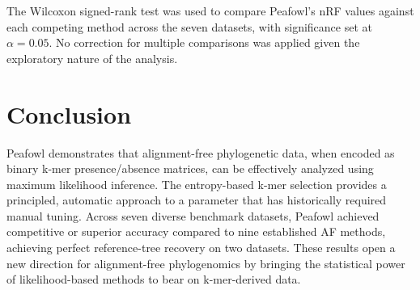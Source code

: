 \documentclass[11pt]{article}
\begin{document}
The Wilcoxon signed-rank test was used to compare Peafowl's nRF values against each competing method across the seven datasets, with significance set at $\alpha = 0.05$. No correction for multiple comparisons was applied given the exploratory nature of the analysis.

\section{Conclusion}

Peafowl demonstrates that alignment-free phylogenetic data, when encoded as binary k-mer presence/absence matrices, can be effectively analyzed using maximum likelihood inference. The entropy-based k-mer selection provides a principled, automatic approach to a parameter that has historically required manual tuning. Across seven diverse benchmark datasets, Peafowl achieved competitive or superior accuracy compared to nine established AF methods, achieving perfect reference-tree recovery on two datasets. These results open a new direction for alignment-free phylogenomics by bringing the statistical power of likelihood-based methods to bear on k-mer-derived data.



\end{document}
